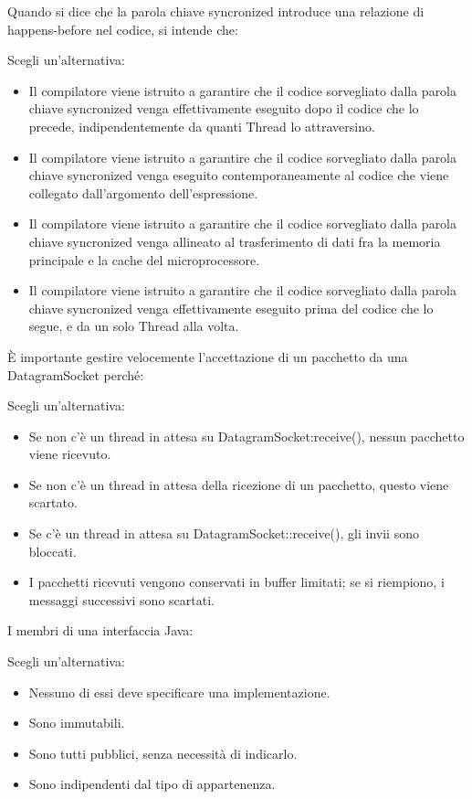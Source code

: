 \documentclass{article}
\begin{document}
Quando si dice che la parola chiave syncronized introduce una relazione di happens-before nel codice, si intende che:

Scegli un'alternativa: 
\begin{itemize}

	\item Il compilatore viene istruito a garantire che il codice sorvegliato
		dalla parola chiave syncronized venga effettivamente eseguito dopo il
		codice che lo precede, indipendentemente da quanti Thread lo
		attraversino.
	\item Il compilatore viene istruito a garantire che il codice sorvegliato
		dalla parola chiave syncronized venga eseguito contemporaneamente al
		codice che viene collegato dall'argomento dell'espressione.
	\item Il compilatore viene istruito a garantire che il codice sorvegliato
		dalla parola chiave syncronized venga allineato al trasferimento di dati
		fra la memoria principale e la cache del microprocessore.
	\item Il compilatore viene istruito a garantire che il codice sorvegliato
		dalla parola chiave syncronized venga effettivamente eseguito prima del
		codice che lo segue, e da un solo Thread alla volta. \checkmark
\end{itemize}

È importante gestire velocemente l'accettazione di un pacchetto da una DatagramSocket perché:

Scegli un'alternativa: 
\begin{itemize}

	\item Se non c'è un thread in attesa su DatagramSocket:receive(), nessun
		pacchetto viene ricevuto.
	\item Se non c'è un thread in attesa della ricezione di un pacchetto, questo
		viene scartato. 
	\item Se c'è un thread in attesa su DatagramSocket::receive(), gli invii
		sono bloccati. 
	\item I pacchetti ricevuti vengono conservati in buffer limitati; se si
		riempiono, i messaggi successivi sono scartati. \checkmark
\end{itemize}


I membri di una interfaccia Java:

Scegli un'alternativa: 
\begin{itemize}
	\item Nessuno di essi deve specificare una implementazione.
	\item Sono immutabili.
	\item Sono tutti pubblici, senza necessità di indicarlo. \checkmark
	\item Sono indipendenti dal tipo di appartenenza.
\end{itemize}
\end{document}
